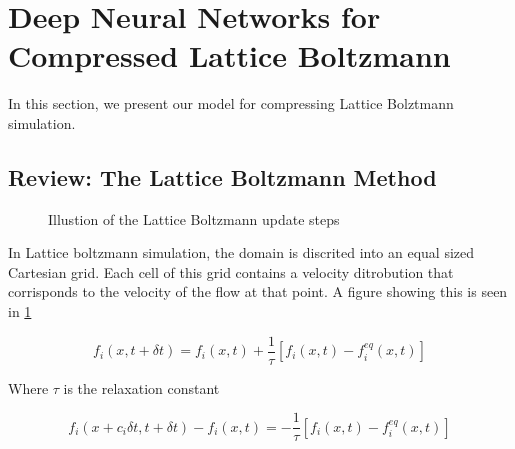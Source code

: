 \documentclass{article}
\begin{document}


\section{Deep Neural Networks for Compressed Lattice Boltzmann}

In this section, we present our model for compressing Lattice Bolztmann simulation.

\subsection{Review: The Lattice Boltzmann Method}

\begin{figure}[!t]
\centering
{}
\caption{Illustion of the Lattice Boltzmann update steps}
\label{lattice_boltzmann}
\end{figure}

In Lattice boltzmann simulation, the domain is discrited into an equal sized Cartesian grid. Each cell of this grid contains a velocity ditrobution that corrisponds to the velocity of the flow at that point. A figure showing this is seen in \ref{lattice_boltzmann}

\begin{equation}
  f_i(x, t+ \delta{t}) = f_i(x,t) + \frac{1}{\tau} [f_i(x,t) - f_i^{eq}(x,t)]
\end{equation}

Where $\tau$ is the relaxation constant

\begin{equation}
  f_i(x+c_i \delta{t}, t+ \delta{t}) - f_i(x,t) = -\frac{1}{\tau} [f_i(x,t) - f_i^{eq}(x,t)]
\end{equation}
\end{document}
